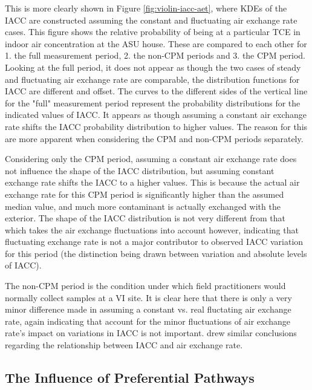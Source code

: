 \documentclass[journal=esthag,manuscript=article]{achemso}
\begin{document}
This is more clearly shown in Figure \ref{fig:violin-iacc-aet}, where KDEs of the IACC are constructed assuming the constant and fluctuating air exchange rate cases.
This figure shows the relative probability of being at a particular TCE in indoor air concentration at the ASU house.
These are compared to each other for 1. the full measurement period, 2. the non-CPM periods and 3. the CPM period.
Looking at the full period, it does not appear as though the two cases of steady and fluctuating air exchange rate are comparable, the distribution functions for IACC are different and offset.
The curves to the different sides of the vertical line for the "full" measurement period represent the probability distributions for the indicated values of IACC.
It appears as though assuming a constant air exchange rate shifts the IACC probability distribution to higher values.
The reason for this are more apparent when considering the CPM and non-CPM periods separately.

Considering only the CPM period, assuming a constant air exchange rate does not influence the shape of the IACC distribution, but assuming constant exchange rate shifts the IACC to a higher values.
This is because the actual air exchange rate for this CPM period is significantly higher than the assumed median value, and much more contaminant is actually exchanged with the exterior.
The shape of the IACC distribution is not very different from that which takes the air exchange fluctuations into account however, indicating that fluctuating exchange rate is not a major contributor to observed IACC variation for this period (the distinction being drawn between variation and absolute levels of IACC).

The non-CPM period is the condition under which field practitioners would normally collect samples at a VI site.
It is clear here that there is only a very minor difference made in assuming a constant vs. real fluctating air exchange rate, again indicating that account for the minor fluctuations of air exchange rate's impact on variations in IACC is not important.
\citeauthor{rackes_time-averaged_2016}\cite{rackes_time-averaged_2016} drew similar conclusions regarding the relationship between IACC and air exchange rate.

\subsection{The Influence of Preferential Pathways}

\end{document}
